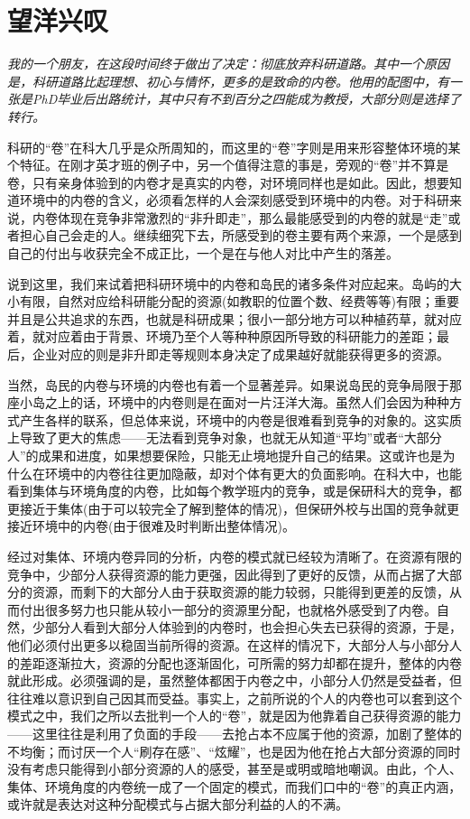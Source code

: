 \documentclass[UTF8,a4paper,fontset=windows,11pt,openany]{ctexbook}
\begin{document}
\section{望洋兴叹}

\emph{我的一个朋友，在这段时间终于做出了决定：彻底放弃科研道路。其中一个原因是，科研道路比起理想、初心与情怀，更多的是致命的内卷。他用的配图中，有一张是PhD毕业后出路统计，其中只有不到百分之四能成为教授，大部分则是选择了转行。}

科研的“卷”在科大几乎是众所周知的，而这里的“卷”字则是用来形容整体环境的某个特征。在刚才英才班的例子中，另一个值得注意的事是，旁观的“卷”并不算是卷，只有亲身体验到的内卷才是真实的内卷，对环境同样也是如此。因此，想要知道环境中的内卷的含义，必须看怎样的人会深刻感受到环境中的内卷。对于科研来说，内卷体现在竞争非常激烈的“非升即走”，那么最能感受到的内卷的就是“走”或者担心自己会走的人。继续细究下去，所感受到的卷主要有两个来源，一个是感到自己的付出与收获完全不成正比，一个是在与他人对比中产生的落差。

说到这里，我们来试着把科研环境中的内卷和岛民的诸多条件对应起来。岛屿的大小有限，自然对应给科研能分配的资源(如教职的位置个数、经费等等)有限；重要并且是公共追求的东西，也就是科研成果；很小一部分地方可以种植药草，就对应着，就对应着由于背景、环境乃至个人等种种原因所导致的科研能力的差距；最后，企业对应的则是非升即走等规则本身决定了成果越好就能获得更多的资源。

当然，岛民的内卷与环境的内卷也有着一个显著差异。如果说岛民的竞争局限于那座小岛之上的话，环境中的内卷则是在面对一片汪洋大海。虽然人们会因为种种方式产生各样的联系，但总体来说，环境中的内卷是很难看到竞争的对象的。这实质上导致了更大的焦虑——无法看到竞争对象，也就无从知道“平均”或者“大部分人”的成果和进度，如果想要保险，只能无止境地提升自己的结果。这或许也是为什么在环境中的内卷往往更加隐蔽，却对个体有更大的负面影响。在科大中，也能看到集体与环境角度的内卷，比如每个教学班内的竞争，或是保研科大的竞争，都更接近于集体(由于可以较完全了解到整体的情况)，但保研外校与出国的竞争就更接近环境中的内卷(由于很难及时判断出整体情况)。

经过对集体、环境内卷异同的分析，内卷的模式就已经较为清晰了。在资源有限的竞争中，少部分人获得资源的能力更强，因此得到了更好的反馈，从而占据了大部分的资源，而剩下的大部分人由于获取资源的能力较弱，只能得到更差的反馈，从而付出很多努力也只能从较小一部分的资源里分配，也就格外感受到了内卷。自然，少部分人看到大部分人体验到的内卷时，也会担心失去已获得的资源，于是，他们必须付出更多以稳固当前所得的资源。在这样的情况下，大部分人与小部分人的差距逐渐拉大，资源的分配也逐渐固化，可所需的努力却都在提升，整体的内卷就此形成。必须强调的是，虽然整体都困于内卷之中，小部分人仍然是受益者，但往往难以意识到自己因其而受益。事实上，之前所说的个人的内卷也可以套到这个模式之中，我们之所以去批判一个人的“卷”，就是因为他靠着自己获得资源的能力——这里往往是利用了负面的手段——去抢占本不应属于他的资源，加剧了整体的不均衡；而讨厌一个人“刷存在感”、“炫耀”，也是因为他在抢占大部分资源的同时没有考虑只能得到小部分资源的人的感受，甚至是或明或暗地嘲讽。由此，个人、集体、环境角度的内卷统一成了一个固定的模式，而我们口中的“卷”的真正内涵，或许就是表达对这种分配模式与占据大部分利益的人的不满。
\end{document}
